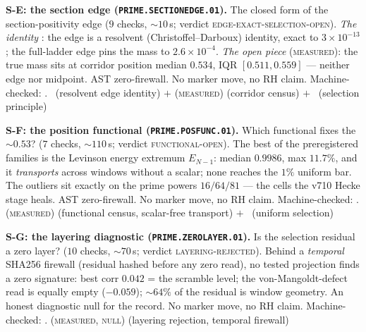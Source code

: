 \par\smallskip\noindent\textbf{S-E: the section edge
(\texttt{PRIME.SECTIONEDGE.01}).}
The closed form of the section-positivity edge ($9$ checks,
${\sim}10$\,s; verdict \textsc{edge-exact-selection-open}).
\emph{The identity} \mE: the edge is a resolvent
(Christoffel--Darboux) identity, exact to $3\times10^{-13}$; the
full-ladder edge pins the mass to $2.6\times10^{-4}$.  \emph{The
open piece} (\textsc{measured}): the true mass sits at corridor
position median $0.534$, IQR $[0.511,0.559]$ --- neither edge nor
midpoint.  AST zero-firewall.  No marker move, no RH claim.
Machine-checked: .
\mE\ (resolvent edge identity) $+$ (\textsc{measured}) (corridor
census) $+$ \mO\ (selection principle)
\par\smallskip


\par\smallskip\noindent\textbf{S-F: the position functional
(\texttt{PRIME.POSFUNC.01}).}
Which functional fixes the $\sim0.53$? ($7$ checks, ${\sim}110$\,s;
verdict \textsc{functional-open}).  The best of the preregistered
families is the Levinson energy extremum $E_{N-1}$: median $0.9986$,
max $11.7\%$, and it \emph{transports} across windows without a
scalar; none reaches the $1\%$ uniform bar.  The outliers sit
exactly on the prime powers $16/64/81$ --- the cells the v710 Hecke
stage heals.  AST zero-firewall.  No marker move, no RH claim.
Machine-checked: .
(\textsc{measured}) (functional census, scalar-free transport) $+$
\mO\ (uniform selection)
\par\smallskip


\par\smallskip\noindent\textbf{S-G: the layering diagnostic
(\texttt{PRIME.ZEROLAYER.01}).}
Is the selection residual a zero layer? ($10$ checks, ${\sim}70$\,s;
verdict \textsc{layering-rejected}).  Behind a \emph{temporal}
SHA256 firewall (residual hashed before any zero read), no tested
projection finds a zero signature: best corr $0.042$ = the scramble
level; the von-Mangoldt-defect read is equally empty ($-0.059$);
${\sim}64\%$ of the residual is window geometry.  An honest
diagnostic null for the record.  No marker move, no RH claim.
Machine-checked: .
(\textsc{measured}, \textsc{null}) (layering rejection, temporal
firewall)
\par\smallskip


